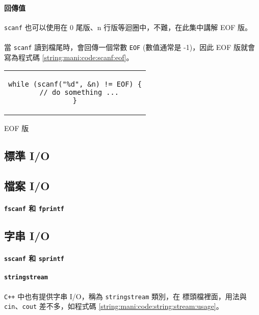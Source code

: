\documentclass[12pt,a4paper,oneside]{report}
\begin{document}
\begin{CJK}{UTF8}{bkai}
\paragraph{回傳值}\lstinline!scanf! 也可以使用在 0 尾版、n 行版等迴圈中，不難，在此集中講解 EOF 版。
\paragraph{}當 \lstinline!scanf! 讀到檔尾時，會回傳一個常數 \lstinline!EOF! (數值通常是 -1)，因此 EOF 版就會寫為程式碼 \ref{string:mani:code:scanf:eof}。

\begin{code}[h!]
  \centering
  \begin{tabular}{c}
  \begin{lstlisting}
while (scanf("%d", &n) != EOF) {
  // do something ...
}
  \end{lstlisting}
  \end{tabular}
  \caption{EOF 版}
  \label{string:mani:code:scanf:eof}
\end{code}

\subsection{標準 I/O}

\subsection{檔案 I/O}
\paragraph{\lstinline!fscanf! 和 \lstinline!fprintf!}

\subsection{字串 I/O}

\paragraph{\lstinline!sscanf! 和 \lstinline!sprintf!}

\paragraph{\lstinline!stringstream!}\texttt{C++} 中也有提供字串 I/O，稱為 \lstinline!stringstream! 類別，在  標頭檔裡面，用法與 \lstinline!cin!、\lstinline!cout! 差不多，如程式碼 \ref{string:mani:code:string:stream:usage}。


\end{CJK}
\end{document}
